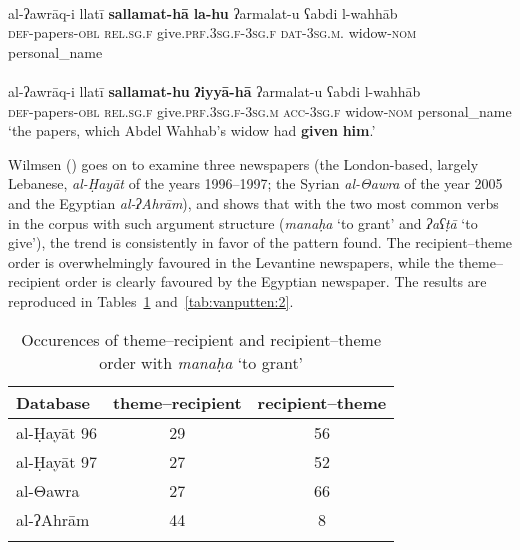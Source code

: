 \documentclass[output=paper]{langsci/langscibook}
\begin{document}
\ea
{}\\
\gll al-ʔawrāq-i llatī \textbf{sallamat-hā} \textbf{la-hu} ʔarmalat-u ʕabdi l-wahhāb\\
     \textsc{def}{}-papers-\textsc{obl} \textsc{rel.sg.f} give.\textsc{prf.3sg.f-3sg.f} \textsc{dat-3sg.m.} widow-\textsc{nom} personal\_name\\
\z
\ea\label{ex:vanputten:}
{}\\
\gll al-ʔawrāq-i llatī \textbf{sallamat-hu} \textbf{ʔiyyā-hā} ʔarmalat-u ʕabdi l-wahhāb\\
     \textsc{def}{}-papers-\textsc{obl} \textsc{rel.sg.f} give.\textsc{prf.3sg.f-3sg.m} \textsc{acc-3sg.f} widow-\textsc{nom} personal\_name\\
\glt ‘the papers, which Abdel Wahhab’s widow had \textbf{given} \textbf{him}.’\z

Wilmsen (\citeyear[114--115]{Wilmsen2010}) goes on to examine three newspapers (the London-based, largely Lebanese, \textit{al-Ḥayāt} of the years 1996--1997; the Syrian \textit{al-Θawra} of the year 2005 and the Egyptian \textit{al-ʔAhrām}), and shows that with the two most common verbs in the corpus with such argument structure (\textit{manaḥa} ‘to grant’ and \textit{ʔaʕṭā} ‘to give’), the trend is consistently in favor of the pattern found. The recipient–theme order is overwhelmingly favoured in the Levantine newspapers, while the theme–recipient order is clearly favoured by the Egyptian newspaper. The results are reproduced in Tables~\ref{tab:vanputten:1} and~\ref{tab:vanputten:2}.


\begin{table}
\begin{tabular}{lcc}
\lsptoprule
{Database} & {theme–recipient} & {recipient–theme}\\\midrule
al-Ḥayāt 96 & 29 & 56\\
al-Ḥayāt 97 & 27 & 52\\
al-Θawra & 27 & 66\\
al-ʔAhrām & 44 & \hphantom{1}8\\
\lspbottomrule
\end{tabular}
\caption{\label{bkm:Ref533762442}\label{tab:vanputten:1}Occurences of theme–recipient and recipient–theme order with \textit{manaḥa} ‘to grant’}
\end{table}
\end{document}
